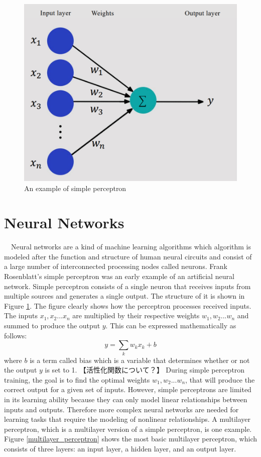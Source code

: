 \begin{figure}[h]
  \centering
  \includegraphics[width=130truemm]{resources/2_background/simple_perceptron.png}
  \caption{
    An example of simple perceptron
  }
  \label{simple_perceptron}
\end{figure}

\section{Neural Networks}
　Neural networks are a kind of machine learning algorithms which 
algorithm is modeled after the function and structure of human 
neural circuits and consist of a large number of interconnected 
processing nodes called neurons.
Frank Rosenblatt's simple perceptron \cite{Rosenblatt1958ThePA} was 
an early example of an artificial neural network. 
Simple perceptron consists of a single neuron that receives inputs 
from multiple sources and generates a single output. 
The structure of it is shown in Figure \ref{simple_perceptron}. 
The figure clearly shows how the perceptron processes received inputs.
The inputs $x_1, x_2 ... x_n$ are multiplied by their respective weights
$w_1, w_2 ... w_n$ and summed to produce the output $y$.
This can be expressed mathematically as follows:
\begin{equation}
  \label{perceptron_output}
  y = \sum_{k}w_k x_k + b
\end{equation}
where $b$ is a term called bias which is a variable that determines 
whether or not the output $y$ is set to 1.
【活性化関数について？】
During simple perceptron training, the goal is to find the optimal 
weights $w_1, w_2 ... w_n$, that will produce the correct output for 
a given set of inputs.
However, simple perceptrons are limited in its learning ability because 
they can only model linear relationships between inputs and outputs.
Therefore more complex neural networks are needed for learning tasks 
that require the modeling of nonlinear relationships.
A multilayer perceptron, which is a multilayer version of a simple 
perceptron, is one example. Figure \ref{multilayer_perceptron} shows
the most basic multilayer perceptron, which consists of three layers: 
an input layer, a hidden layer, and an output layer.

